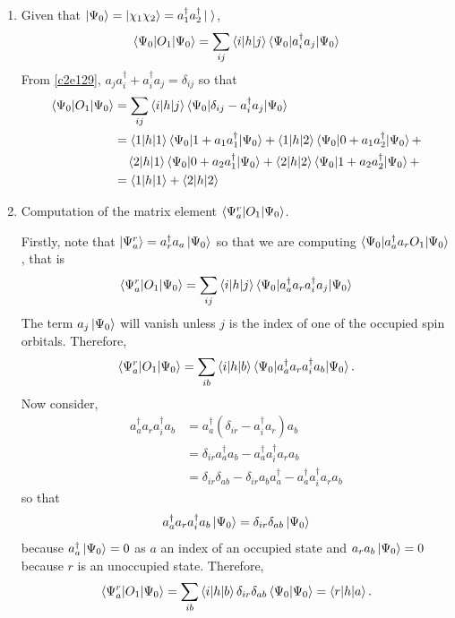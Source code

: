 \begin{enumerate}
\item\label{c2p29} Given that $\ket{\Psi_0} = \ket{\chi_1\chi_2} = a_1^\dagger
a_2^\dagger\ket{\;}$,
\[
\braket{\Psi_0|O_1|\Psi_0} = \sum_{ij}\braket{i|h|j}\braket{\Psi_0|a_i^\dagger
  a_j|\Psi_0} 
\]
From \eqref{c2e129}, $a_j a_i^\dagger + a_i^\dagger a_j = \delta_{ij}$ so that
\[
\begin{aligned}
\braket{\Psi_0|O_1|\Psi_0} &= \sum_{ij}\braket{i|h|j}\braket{\Psi_0|\delta_{ij}
 - a_i^\dagger a_j|\Psi_0} \\
 &= \braket{1|h|1}\braket{\Psi_0|1 + a_1 a_1^\dagger|\Psi_0} +
    \braket{1|h|2}\braket{\Psi_0|0 + a_1 a_2^\dagger|\Psi_0} + \\
 &\quad\braket{2|h|1}\braket{\Psi_0|0 + a_2 a_1^\dagger|\Psi_0} +
    \braket{2|h|2}\braket{\Psi_0|1 + a_2 a_2^\dagger|\Psi_0} + \\
 &= \braket{1|h|1} + \braket{2|h|2}
\end{aligned}
\]

\item\label{c2p30} Computation of the matrix element
$\braket{\Psi_a^r|O_1|\Psi_0}$.

Firstly, note that $\ket{\Psi_a^r} = a_r^\dagger a_a\ket{\Psi_0}$ so that we
are computing $\braket{\Psi_0|a_a^\dagger a_r O_1|\Psi_0}$, that is
\[
\braket{\Psi_a^r|O_1|\Psi_0} = \sum_{ij}\braket{i|h|j}\braket{\Psi_0|a_a^\dagger
a_r a_i^\dagger a_j|\Psi_0}
\]
The term $a_j\ket{\Psi_0}$ will vanish unless $j$ is the index of one of the 
occupied spin orbitals. Therefore,
\[
\braket{\Psi_a^r|O_1|\Psi_0} = \sum_{ib}\braket{i|h|b}\braket{\Psi_0|a_a^\dagger
a_r a_i^\dagger a_b|\Psi_0}.
\]
Now consider,
\[
\begin{aligned}
a_a^\dagger a_r a_i^\dagger a_b&=a_a^\dagger(\delta_{ir} - a_i^\dagger a_r)a_b \\
&= \delta_{ir}a_a^\dagger a_b - a_a^\dagger a_i^\dagger a_r a_b \\
&= \delta_{ir}\delta_{ab} - \delta_{ir}a_b a_a^\dagger - a_a^\dagger 
   a_i^\dagger a_r a_b
\end{aligned}
\]
so that
\[
a_a^\dagger a_r a_i^\dagger a_b\ket{\Psi_0} = \delta_{ir}\delta_{ab}\ket{\Psi_0}
\]
because $a_a^\dagger\ket{\Psi_0} = 0$ as $a$ an index of an occupied state and
$a_ra_b\ket{\Psi_0} = 0$ because $r$ is an unoccupied state. Therefore,
\[
\braket{\Psi_a^r|O_1|\Psi_0} = \sum_{ib}\braket{i|h|b}\delta_{ir}\delta_{ab}
\braket{\Psi_0|\Psi_0} = \braket{r|h|a}.
\]


\end{enumerate}
